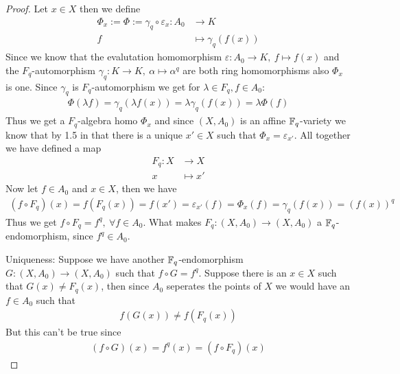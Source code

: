 \documentclass[]{article}
\begin{document}
\begin{proof}
    Let \(x \in X\) then we define
    \begin{align*}
        \Phi_x:= \Phi := \gamma_q \circ \varepsilon_x : A_0 &\rightarrow K \\
            f &\mapsto \gamma_q(f(x))
    \end{align*}
    Since we know that the evalutation homomorphism \(\varepsilon:A_0 \rightarrow K, \ f \mapsto f(x)\) 
    and the \(F_q\)-automorphism \(\gamma_q:K \rightarrow K, \ \alpha \mapsto \alpha^q\) are both ring homomorphisms also
    \(\Phi_x\) is one. Since \(\gamma_q\) is \(F_q\)-automorphism we get for \(\lambda \in F_q, f \in A_0:\)
    \begin{align*}
        \Phi(\lambda f ) = \gamma_q(\lambda f(x)) = \lambda \gamma_q(f(x))= \lambda \Phi(f)
    \end{align*}
    Thus we get a \(F_q\)-algebra homo \(\Phi_x\) and since \((X,A_0)\) is an affine \({\mathbb{F}}_q\)-variety we know that by 1.5 in \cite{kehr} that there
    is a unique \(x' \in X\) such that \(\Phi_x = \varepsilon_{x'}\). All together we have defined a map
    \begin{align*}
        F_q: X &\rightarrow X \\
            x &\mapsto x'
    \end{align*}
    Now let \(f \in A_0\) and \(x \in X\), then we have
    \begin{align*}
        (f \circ F_q)(x)=f(F_q(x))=f(x')=\varepsilon_{x'}(f)=\Phi_x(f)=\gamma_q(f(x))=(f(x))^q
    \end{align*}
    Thus we get \(f \circ F_q = f^q, \ \forall f \in A_0\). What makes \(F_q: (X, A_0) \rightarrow (X, A_0)\) a \({\mathbb{F}}_q\)-endomorphism, since \(f^q \in A_0\).
    
    Uniqueness: Suppose we have another \({\mathbb{F}}_q\)-endomorphism \(G:(X,A_0) \rightarrow (X,A_0)\) such that \(f \circ G = f^q\). 
    Suppose there is an \(x \in X\) such that \(G(x) \neq F_q(x)\), then since \(A_0\) seperates the points of \(X\) we would have
    an \(f \in A_0\) such that
    \begin{align*}
        f(G(x))\neq f(F_q(x))
    \end{align*}
    But this can't be true since
    \begin{align*}
        (f \circ G)(x)=f^q(x)=(f \circ F_q)(x)
    \end{align*}


\end{proof}
\end{document}
